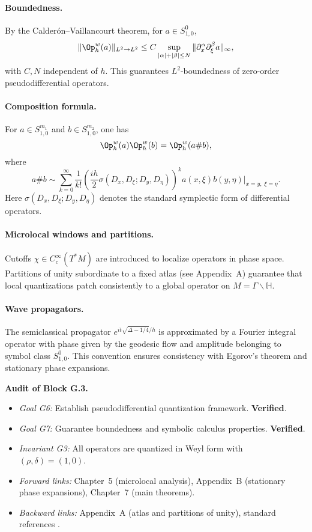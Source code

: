 \paragraph{Boundedness.}  
By the Calderón–Vaillancourt theorem, for $a\in S^0_{1,0}$, 
\[
\|\Op_h^w(a)\|_{L^2 \to L^2} \le C \sup_{|\alpha|+|\beta|\le N}
\|\partial_x^\alpha \partial_\xi^\beta a\|_\infty,
\]
with $C,N$ independent of $h$. This guarantees $L^2$-boundedness of zero-order pseudodifferential operators.

\paragraph{Composition formula.}  
For $a\in S^{m_1}_{1,0}$ and $b\in S^{m_2}_{1,0}$, one has
\[
\Op_h^w(a)\Op_h^w(b) = \Op_h^w(a\# b),
\]
where
\[
a\# b \sim \sum_{k=0}^\infty \frac{1}{k!}\left(\frac{ih}{2}\sigma(D_x,D_\xi;D_y,D_\eta)\right)^k
a(x,\xi)b(y,\eta)\Big|_{x=y,\;\xi=\eta}.
\]
Here $\sigma(D_x,D_\xi;D_y,D_\eta)$ denotes the standard symplectic form of differential operators.

\paragraph{Microlocal windows and partitions.}  
Cutoffs $\chi \in C_c^\infty(T^*M)$ are introduced to localize operators in phase space.  
Partitions of unity subordinate to a fixed atlas (see Appendix~A) guarantee that local quantizations patch consistently to a global operator on $M=\Gamma\backslash \mathbb{H}$.

\paragraph{Wave propagators.}  
The semiclassical propagator $e^{it\sqrt{\Delta-1/4}/h}$ is approximated by a Fourier integral operator with phase given by the geodesic flow and amplitude belonging to symbol class $S^0_{1,0}$.  
This convention ensures consistency with Egorov’s theorem and stationary phase expansions.

\bigskip
\noindent\textbf{Audit of Block G.3.}
\begin{itemize}
    \item \emph{Goal G6:} Establish pseudodifferential quantization framework. \textbf{Verified}.
    \item \emph{Goal G7:} Guarantee boundedness and symbolic calculus properties. \textbf{Verified}.
    \item \emph{Invariant G3:} All operators are quantized in Weyl form with $(\rho,\delta)=(1,0)$.  
    \item \emph{Forward links:} Chapter~5 (microlocal analysis), Appendix~B (stationary phase expansions), Chapter~7 (main theorems).  
    \item \emph{Backward links:} Appendix~A (atlas and partitions of unity), standard references \cite{Zworski, Hormander}.  
\end{itemize}

